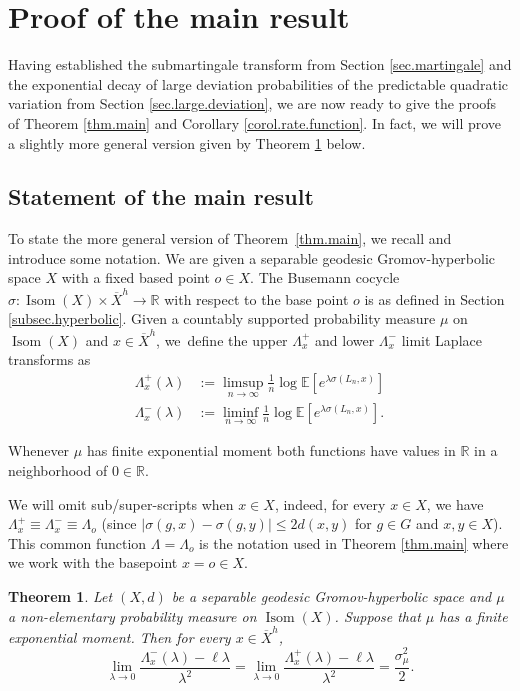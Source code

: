 \documentclass[JEP,XML,SOM,Unicode,published]{cedram}
\theoremstyle{plain}
\newtheorem{theorem}{Theorem}[section]
\theoremstyle{definition}
\newcommand\R{\mathbb{R}}
\DeclareMathOperator\Isom{Isom}
\begin{document}
\section{Proof of the main result}\label{sec.proof}
Having established the submartingale transform from Section \ref{sec.martingale} and the exponential decay of large deviation probabilities of the predictable quadratic variation from Section \ref{sec.large.deviation}, we are now ready to give the proofs of Theorem \ref{thm.main} and Corollary \ref{corol.rate.function}. In fact, we will prove a slightly more general version given by Theorem \ref{thm.main.tech} below.

\subsection{Statement of the main result}
To state the more general version of Theorem~\ref{thm.main}, we recall and introduce some notation. We are given a separable geodesic Gromov-hyperbolic space $X$ with a fixed based point $o \in X$. The Busemann cocycle $\sigma: \Isom(X) \times \overline{X}^h \to \R$ with respect to the base point $o$ is as defined in Section \ref{subsec.hyperbolic}. Given a countably supported probability measure $\mu$ on $\Isom(X)$ and $x \in \overline{X}^h$, we~define the upper $\Lambda_x^+$ and lower $\Lambda_x^-$ limit Laplace transforms as
\begin{align*}
\Lambda_x^+(\lambda)&:=\limsup_{n \to \infty} \frac{1}{n} \log \mathbb{E}[e^{\lambda\sigma(L_n,x)}]
\\
\tag*{and}
\Lambda_x^-(\lambda)&:=\liminf_{n \to \infty} \frac{1}{n} \log \mathbb{E}[e^{\lambda\sigma(L_n,x)}].
\end{align*}

Whenever $\mu$ has finite exponential moment both functions have values in $\R$ in a neighborhood of $0 \in \R$.

We will omit sub/super-scripts when $x\in X$, indeed, for every $x \in X$, we have $\Lambda_x^+ \equiv \Lambda_x^-\equiv \Lambda_o$ (since $|\sigma(g,x)-\sigma(g,y)|\leq 2 d(x,y)$ for $g\in G$ and $x,y\in X$). This common function $\Lambda=\Lambda_o$ is the notation used in Theorem \ref{thm.main} where we work with the basepoint $x=o \in X$.

\begin{theorem}\label{thm.main.tech}
Let $(X,d)$ be a separable geodesic Gromov-hyperbolic space and $\mu$ a non-elementary probability measure on $\Isom(X)$. Suppose that $\mu$ has a finite exponential moment. Then for every $x\in \overline{X}^h$,
\[
\lim_{\lambda \to 0} \frac{\Lambda_x^-(\lambda)-\ell \lambda }{\lambda^2}=
\lim_{\lambda \to 0} \frac{\Lambda_x^+(\lambda)-\ell \lambda }{\lambda^2}=\frac{\sigma^2_{\mu}}{2}.
\]
\end{theorem}
\end{document}
